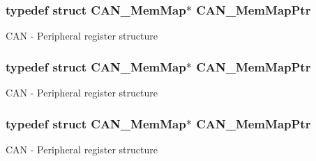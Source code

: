 \subsubsection[{\texorpdfstring{C\+A\+N\+\_\+\+Mem\+Map\+Ptr}{CAN_MemMapPtr}}]{\setlength{\rightskip}{0pt plus 5cm}typedef struct {\bf C\+A\+N\+\_\+\+Mem\+Map}$\ast$ {\bf C\+A\+N\+\_\+\+Mem\+Map\+Ptr}}\hypertarget{group___c_a_n___peripheral_gadc219505f1f3c5212d1e670b3d57d9b6}{}\label{group___c_a_n___peripheral_gadc219505f1f3c5212d1e670b3d57d9b6}
C\+AN -\/ Peripheral register structure 
\subsubsection[{\texorpdfstring{C\+A\+N\+\_\+\+Mem\+Map\+Ptr}{CAN_MemMapPtr}}]{\setlength{\rightskip}{0pt plus 5cm}typedef struct {\bf C\+A\+N\+\_\+\+Mem\+Map}$\ast$ {\bf C\+A\+N\+\_\+\+Mem\+Map\+Ptr}}\hypertarget{group___c_a_n___peripheral_gadc219505f1f3c5212d1e670b3d57d9b6}{}\label{group___c_a_n___peripheral_gadc219505f1f3c5212d1e670b3d57d9b6}
C\+AN -\/ Peripheral register structure 
\subsubsection[{\texorpdfstring{C\+A\+N\+\_\+\+Mem\+Map\+Ptr}{CAN_MemMapPtr}}]{\setlength{\rightskip}{0pt plus 5cm}typedef struct {\bf C\+A\+N\+\_\+\+Mem\+Map}$\ast$ {\bf C\+A\+N\+\_\+\+Mem\+Map\+Ptr}}\hypertarget{group___c_a_n___peripheral_gadc219505f1f3c5212d1e670b3d57d9b6}{}\label{group___c_a_n___peripheral_gadc219505f1f3c5212d1e670b3d57d9b6}
C\+AN -\/ Peripheral register structure 